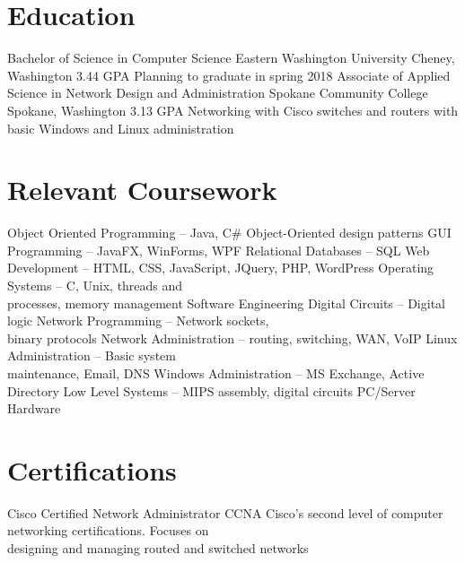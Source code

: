 \documentclass[11pt,letterpaper,sans]{moderncv}
\begin{document}
\makecvtitle{}


\section{Education}
	{Bachelor of Science in Computer Science}
	{Eastern Washington University}
	{Cheney, Washington}
	{3.44 GPA}
	{Planning to graduate in spring 2018}
	{Associate of Applied Science in Network Design and Administration}
	{Spokane Community College}
	{Spokane, Washington}
	{3.13 GPA}
	{Networking with Cisco switches and routers with basic Windows and Linux
	administration}


\section{Relevant Coursework}
\cvlistdoubleitem %
	{Object Oriented Programming -- Java, C\#} %
	{Object-Oriented design patterns}
\cvlistdoubleitem %
	{GUI Programming -- JavaFX, WinForms, WPF} %
	{Relational Databases -- SQL} %
\cvlistdoubleitem %
	{Web Development -- HTML, CSS, JavaScript, JQuery, PHP, WordPress} %
	{Operating Systems -- C, Unix, threads and\\ processes, memory management} %
\cvlistdoubleitem %
	{Software Engineering} %
	{Digital Circuits -- Digital logic} %
\cvlistdoubleitem %
	{Network Programming -- Network sockets,\\ binary protocols} %
	{Network Administration -- routing, switching, WAN, VoIP} %
\cvlistdoubleitem %
	{Linux Administration -- Basic system\\ maintenance, Email, DNS} %
	{Windows Administration -- MS Exchange, Active Directory} %
\cvlistdoubleitem %
	{Low Level Systems -- MIPS assembly, digital circuits} %
	{PC/Server Hardware}


\section{Certifications}
	{Cisco Certified Network Administrator}
	{CCNA}
	{}
	{}
	{Cisco's second level of computer networking certifications. Focuses on\\
	designing and managing routed and switched networks}



\clearpage

\end{document}
